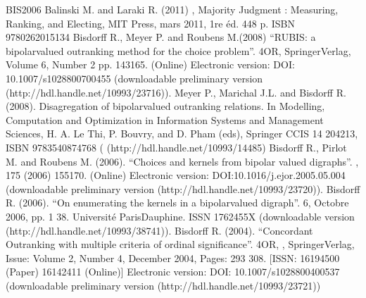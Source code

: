 \documentclass[a4paper,12pt,english]{sphinxhowto}
\begin{document}
\begin{sphinxthebibliography}{BIS\sphinxhyphen{}2006}
\sphinxAtStartPar
Balinski M. and Laraki R. (2011) , Majority Judgment : Measuring, Ranking, and Electing, MIT Press, mars 2011, 1re éd. 448 p. ISBN 978\sphinxhyphen{}0\sphinxhyphen{}262\sphinxhyphen{}01513\sphinxhyphen{}4
\sphinxAtStartPar
Bisdorff R., Meyer P. and Roubens M.(2008) “RUBIS: a bipolar\sphinxhyphen{}valued outranking method for the choice problem”. 4OR,  Springer\sphinxhyphen{}Verlag, Volume 6,  Number 2 pp. 143\sphinxhyphen{}165. (Online) Electronic version: DOI: 10.1007/s10288\sphinxhyphen{}007\sphinxhyphen{}0045\sphinxhyphen{}5 (downloadable preliminary version  (http://hdl.handle.net/10993/23716)).
\sphinxAtStartPar
Meyer P., Marichal J.\sphinxhyphen{}L. and Bisdorff R. (2008). Disagregation of bipolar\sphinxhyphen{}valued outranking relations. In Modelling, Computation and Optimization in Information Systems and Management Sciences, H. A. Le Thi, P. Bouvry, and D. Pham (eds), Springer CCIS 14 204\sphinxhyphen{}213, ISBN 978\sphinxhyphen{}3\sphinxhyphen{}540\sphinxhyphen{}87476\sphinxhyphen{}8 ( (http://hdl.handle.net/10993/14485)
\sphinxAtStartPar
Bisdorff R., Pirlot M. and Roubens M. (2006). “Choices and kernels from bipolar valued digraphs”. , 175 (2006) 155\sphinxhyphen{}170. (Online) Electronic version: DOI:10.1016/j.ejor.2005.05.004 (downloadable preliminary version  (http://hdl.handle.net/10993/23720)).
\sphinxAtStartPar
Bisdorff R. (2006). “On enumerating the kernels in a bipolar\sphinxhyphen{}valued digraph”.  6, Octobre 2006, pp. 1 \sphinxhyphen{} 38. Université Paris\sphinxhyphen{}Dauphine. ISSN 1762\sphinxhyphen{}455X (downloadable version  (http://hdl.handle.net/10993/38741)).
\sphinxAtStartPar
Bisdorff R. (2004). “Concordant Outranking with multiple criteria of ordinal significance”. 4OR, , Springer\sphinxhyphen{}Verlag, Issue: Volume 2, Number 4, December 2004, Pages: 293 \sphinxhyphen{} 308. {[}ISSN: 1619\sphinxhyphen{}4500 (Paper) 1614\sphinxhyphen{}2411 (Online){]} Electronic version: DOI: 10.1007/s10288\sphinxhyphen{}004\sphinxhyphen{}0053\sphinxhyphen{}7 (downloadable preliminary version  (http://hdl.handle.net/10993/23721))

\end{sphinxthebibliography}
\end{document}
